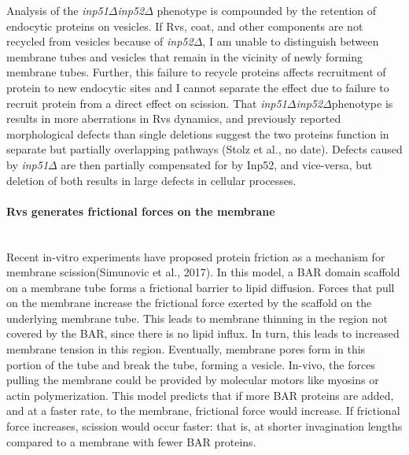 	\vspace{5mm}

				Analysis of the \textit{inp51$\Delta$}\textit{inp52$\Delta$} phenotype is compounded by the retention of endocytic proteins on vesicles. If Rvs, coat, and other components are not recycled from vesicles because of \textit{inp52$\Delta$}, I am unable to distinguish between membrane tubes and vesicles that remain in the vicinity of newly forming membrane tubes. Further, this failure to recycle proteins affects recruitment of protein to new endocytic sites and I cannot separate the effect due to failure to recruit protein from a direct effect on scission. That \textit{inp51$\Delta$}\textit{inp52$\Delta$}phenotype is results in more aberrations in Rvs dynamics, and previously reported morphological defects than single deletions suggest the two proteins function in separate but partially overlapping pathways (Stolz et al., no date). Defects caused by \textit{inp51$\Delta$}
 are then partially compensated for by Inp52, and vice-versa, but deletion of both results in large defects in cellular processes.




\newpage

	\paragraph{Rvs generates frictional forces on the membrane}
				\mbox{}\\
Recent in-vitro experiments have proposed protein friction as a mechanism for membrane scission(Simunovic et al., 2017). In this model, a BAR domain scaffold on a membrane tube forms a frictional barrier to lipid diffusion. Forces that pull on the membrane increase the frictional force exerted by the scaffold on the underlying membrane tube. This leads to membrane thinning in the region not covered by the BAR, since there is no lipid influx. In turn, this leads to increased membrane tension in this region. Eventually, membrane pores form in this portion of the tube and break the tube, forming a vesicle. In-vivo, the forces pulling the membrane could be provided by molecular motors like myosins or actin polymerization.
This model predicts that if more BAR proteins are added, and at a faster rate, to the membrane, frictional force would increase. If frictional force increases, scission would occur faster: that is, at shorter invagination lengths compared to a membrane with fewer BAR proteins. 


